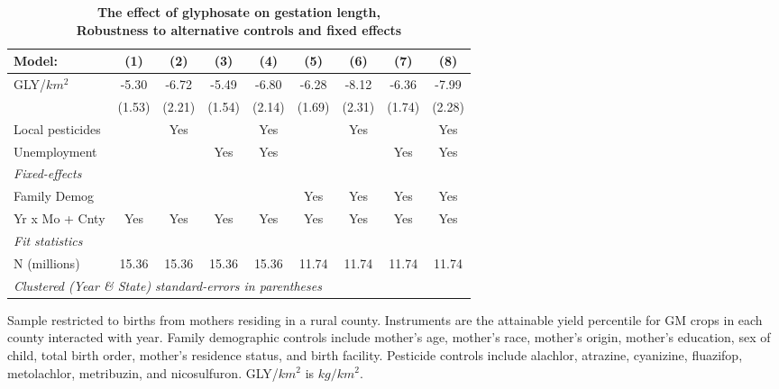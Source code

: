 \begin{table}[htbp]
   \centering
   \small
   \begin{threeparttable}[b]
      \caption{\label{tab:robust-cntrl-gestation-allyielddiffpercentilegmo} \textbf{The effect of glyphosate on gestation length, \\ Robustness to alternative controls and fixed effects}}
      \begin{tabular}{lcccccccc}
         \toprule
         Model:           & (1)    & (2)    & (3)    & (4)    & (5)    & (6)    & (7)    & (8)\\  
         \midrule 
         GLY/$km^2$       & -5.30  & -6.72  & -5.49  & -6.80  & -6.28  & -8.12  & -6.36  & -7.99\\   
                          & (1.53) & (2.21) & (1.54) & (2.14) & (1.69) & (2.31) & (1.74) & (2.28)\\   
         Local pesticides &        & Yes    &        & Yes    &        & Yes    &        & Yes\\  
         Unemployment     &        &        & Yes    & Yes    &        &        & Yes    & Yes\\  
         \midrule
         \emph{Fixed-effects}\\
         Family Demog     &        &        &        &        & Yes    & Yes    & Yes    & Yes\\  
         Yr x Mo + Cnty   & Yes    & Yes    & Yes    & Yes    & Yes    & Yes    & Yes    & Yes\\  
         \midrule
         \emph{Fit statistics}\\
         N (millions)     & 15.36  & 15.36  & 15.36  & 15.36  & 11.74  & 11.74  & 11.74  & 11.74\\  
         \midrule
         \multicolumn{9}{l}{\emph{Clustered (Year \& State) standard-errors in parentheses}}\\
      \end{tabular}
      
      \begin{tablenotes}\item Sample restricted to births from mothers residing in a rural county. Instruments are the attainable yield percentile for GM crops in each county interacted with year. Family demographic controls include mother's age, mother's race, mother's origin, mother's education, sex of child, total birth order, mother's residence status, and birth facility. Pesticide controls include alachlor, atrazine, cyanizine, fluazifop, metolachlor, metribuzin, and nicosulfuron. GLY/$km^2$ is $kg/km^2$.
      \end{tablenotes}
   \end{threeparttable}
\end{table}
